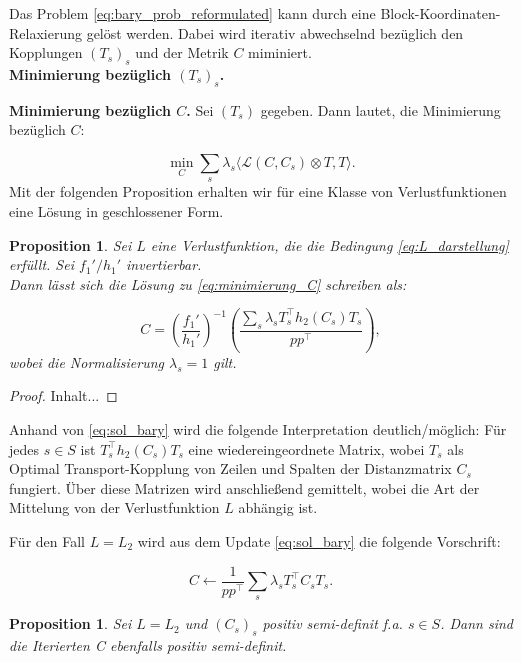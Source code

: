 \documentclass[twoside, 11pt,a4paper]{article}
\newtheorem{proposition}[theorem]{Proposition}
\numberwithin{equation}{section}
\begin{document}
Das Problem \autoref{eq:bary_prob_reformulated} kann durch eine Block-Koordinaten-Relaxierung gelöst werden. Dabei wird iterativ abwechselnd bezüglich den Kopplungen $(T_s)_s$ und der Metrik $C$ miminiert.\\

\noindent \textbf{Minimierung bezüglich $(T_s)_s$.}


\noindent \textbf{Minimierung bezüglich $C$.} Sei $(T_s)$ gegeben. Dann lautet, die Minimierung bezüglich $C$:

\begin{equation}
	\min_C \sum_s{\lambda_s \langle \mathcal{L}(C,C_s) \otimes T,T \rangle}. \label{eq:minimierung_C}
\end{equation}
Mit der folgenden Proposition erhalten wir für eine Klasse von Verlustfunktionen eine Lösung in geschlossener Form.


\begin{proposition}
	Sei $L$ eine Verlustfunktion, die die Bedingung \autoref{eq:L_darstellung} erfüllt. Sei $f_1'/h_1'$ invertierbar. \\
	Dann lässt sich die Lösung zu \autoref{eq:minimierung_C} schreiben als:
	
	\begin{equation}
		C = \left(\frac{f_1'}{h_1'}\right)^{-1} \left(\frac{\sum_s{\lambda_s T_s^\top h_2(C_s)T_s}}{pp^\top}\right),
		\label{eq:sol_bary}
	\end{equation}
	wobei die Normalisierung $\lambda_s = 1$ gilt.
\end{proposition}
\begin{proof}
	Inhalt...
\end{proof}
Anhand von \autoref{eq:sol_bary} wird die folgende Interpretation deutlich/möglich: Für jedes $s \in S$ ist $T_s^\top h_2(C_s)T_s$ eine wiedereingeordnete Matrix, wobei $T_s$ als Optimal Transport-Kopplung von Zeilen und Spalten der Distanzmatrix $C_s$ fungiert. Über diese Matrizen wird anschließend gemittelt, wobei die Art der Mittelung von der Verlustfunktion $L$ abhängig ist.

Für den Fall $L=L_2$ wird aus dem Update \autoref{eq:sol_bary} die folgende Vorschrift:

\begin{equation}
	C \leftarrow \frac{1}{pp^\top}\sum_s{\lambda_s T_s^\top C_s T_s}.
\end{equation}

\begin{proposition}
	Sei $L=L_2$ und $(C_s)_s$ positiv semi-definit f.a. $s \in S$. Dann sind die Iterierten C ebenfalls positiv semi-definit. 
\end{proposition}
\end{document}
